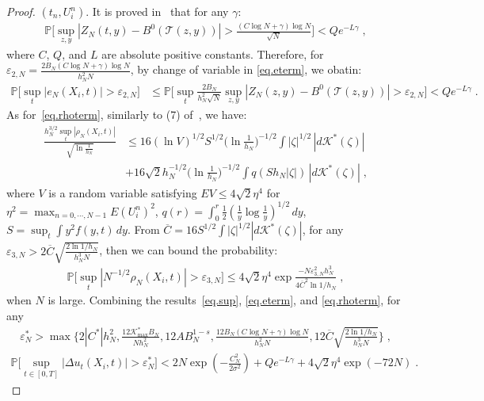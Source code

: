 \documentclass[a4paper,11pt]{article}
\begin{document}
\begin{proof}
	$(t_n,U_i^n)$. It is proved in~\cite{tusnady1977remark} that for any $\gamma$:
\begin{align}
\mathbb{P}\Big[\sup_{z,y}|Z_N(t,y)-B^0(\mathcal{T}(z,y))|>\frac{(C\log N+\gamma)\log N}{\sqrt{N}}\Big]<Qe^{-L \gamma}\;,
\end{align}
where $C$, $Q$, and $L$ are absolute positive constants. Therefore, for  $\varepsilon_{2,N}=\frac{2B_N(C\log N+\gamma)\log N}{h_N^2N}$, by change of variable in \eqref{eq.eterm}, we obatin:
\begin{align*}
	\mathbb{P}\Big[\sup_{t}|e_N(X_i,t)|>\varepsilon_{2,N}\Big]&\leq\mathbb{P}\Big[\sup_{t}\frac{2B_N}{h^2_N\sqrt{N}}\sup_{z,y}|Z_N(z,y)-B^0(\mathcal{T}(z,y))|>\varepsilon_{2,N}\Big]<Qe^{-L\gamma}\;.
\end{align*}
As for~\eqref{eq.rhoterm}, similarly to (7) of~\cite{mack1982weak}, we have:
\begin{align*}
\frac{h_N^{3/2}\sup_t|\rho_N(X_i,t)|}{\sqrt{\ln\frac{1}{h_N}}}&\leq 16(\ln V)^{1/2}S^{1/2}\Big(\ln\frac{1}{h_N}\Big)^{-1/2}\int|\zeta|^{1/2}\,|d\mathcal{K}^*(\zeta)|\\
&+16\sqrt{2}h_N^{-1/2}\Big(\ln\frac{1}{h_N}\Big)^{-1/2}\int q(Sh_N|\zeta|)\,|d\mathcal{K}^*(\zeta)|\;,
\end{align*}
%
%
%
where  $V$ is a random variable satisfying $EV\leq 4\sqrt{2}\eta^4$ for $\eta^2 = \max_{n=0,\cdots,N-1}E(U_i^n)^2$, $q(r)=\int_0^r\frac{1}{2}(\frac{1}{y}\log\frac{1}{y})^{1/2}\,dy$, $S=\sup_t\int y^2f(y,t)\,dy$.  From $\overline{C}=16S^{1/2}\int|\zeta|^{1/2}|d\mathcal{K}^*(\zeta)|$,  for any $\varepsilon_{3,N}>2\overline{C}\sqrt{\frac{2\ln1/h_N}{h_N^3N}}$, then we can bound the probability:
\begin{align}
\mathbb{P}\Big[\sup_t|N^{-1/2}\rho_N(X_i,t)|>\varepsilon_{3,N}\Big]\leq 4\sqrt{2}\eta^4\exp\frac{-N\varepsilon_{3,N}^2h_N^3}{4\overline{C}^2\ln 1/h_N}\;,
\end{align}
when $N$ is large. Combining the results~\eqref{eq.sup}, \eqref{eq.eterm}, and \eqref{eq.rhoterm}, for any 
\begin{align*}
\varepsilon_N^*>\max\{2|C^*|h_N^2,\frac{12\mathcal{K}^*_{\max}B_N}{Nh_N^2},12AB_N^{1-s},\frac{12B_N(C\log N+\gamma)\log N}{h_N^2N},12\overline{C}\sqrt{\frac{2\ln1/h_N}{h_N^3N}}\}	\;,
\end{align*}
\begin{align}
\mathbb{P}\Big[\sup_{t\in[0,T]}|\Delta u_t(X_i,t)|>\varepsilon_N^*\Big]<2N \exp(-\frac{C_N^2}{2\sigma^2})+Qe^{-L\gamma}+4\sqrt{2}\eta^4\exp(-72N)\;.
\end{align}
\end{proof}
\end{document}

